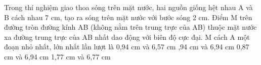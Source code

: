 \begin{vidu}%
Trong thí nghiệm giao thoa sóng trên mặt nước, hai nguồn giống hệt nhau A và B cách nhau 7 cm, tạo ra sóng trên mặt nước với bước sóng 2 cm. Điểm M trên đường tròn đường kính AB (không nằm trên trung trực của AB) thuộc mặt nước xa đường trung trực của AB nhất dao động với biên độ cực đại. M cách A một đoạn nhỏ nhất, lớn nhất lần lượt là
\choice
{0,94 cm và 6,57 cm}
{,94 cm và 6,94 cm}
{0,87 cm và 6,94 cm}
{1,77 cm và 6,77 cm}
\end{vidu} %
